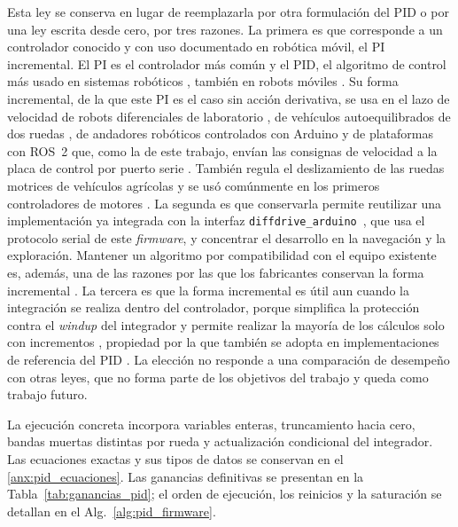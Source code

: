 Esta ley se conserva en lugar de reemplazarla por otra formulación del PID o
por una ley escrita desde cero, por tres razones. La primera es que corresponde
a un controlador conocido y con uso documentado en robótica móvil, el PI
incremental. El PI es el controlador más común
\citep[Sec.~3.6]{astrom2009controlpid} y el PID, el algoritmo de control más
usado en sistemas robóticos \citep{raj2024discussion}, también en robots móviles
\citep{bitria2022optimal}. Su forma incremental, de la que este PI es el caso
sin acción derivativa, se usa en el lazo de velocidad de robots diferenciales de
laboratorio \citep{casini2010remote}, de vehículos autoequilibrados de dos
ruedas \citep{ma2024selfbalancing}, de andadores robóticos controlados con
Arduino \citep{mori2024walker} y de plataformas con ROS~2 que, como la de este
trabajo, envían las consignas de velocidad a la placa de control por puerto serie
\citep{wu2026ros2}. También regula el deslizamiento de las ruedas motrices de
vehículos agrícolas \citep{sun2022travel} y se usó comúnmente en los primeros
controladores de motores \citep[Sec.~13.4]{astrom2009controlpid}. La segunda es
que conservarla permite reutilizar una implementación ya integrada con la
interfaz \texttt{diffdrive\_arduino}~\citep{newans_diffdrive}, que usa el
protocolo serial de este \textit{firmware}, y concentrar el desarrollo en la
navegación y la exploración. Mantener un algoritmo por compatibilidad con el
equipo existente es, además, una de las razones por las que los fabricantes
conservan la forma incremental \citep[Sec.~13.4]{astrom2009controlpid}. La
tercera es que la forma incremental es útil aun cuando la integración se realiza
dentro del controlador, porque simplifica la protección contra el
\textit{windup} del integrador y permite realizar la mayoría de los cálculos
solo con incrementos \citep[Secs.~13.1 y 13.4]{astrom2009controlpid}, propiedad
por la que también se adopta en implementaciones de referencia del PID
\citep{sundstrom2024reference}. La elección no responde a una
comparación de desempeño con otras leyes, que no forma parte de los objetivos
del trabajo y queda como trabajo futuro.

La ejecución concreta incorpora variables enteras, truncamiento hacia cero,
bandas muertas distintas por rueda y actualización condicional del integrador.
Las ecuaciones exactas y sus tipos de datos se conservan en el
\ref{anx:pid_ecuaciones}. Las
ganancias definitivas se presentan en la Tabla~\ref{tab:ganancias_pid}; el orden
de ejecución, los reinicios y la saturación se detallan en el
Alg.~\ref{alg:pid_firmware}.

